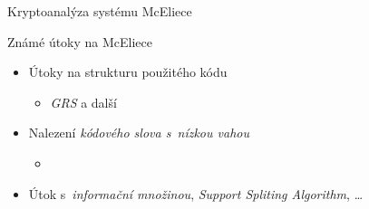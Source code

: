 \documentclass{beamer}
\begin{document}
\begin{frame}{Kryptoanalýza systému McEliece}

    \begin{alertblock}{Známé útoky na McEliece}
        \begin{itemize}

                \pause
            \item Útoky na strukturu použitého kódu
                \begin{itemize}
                    \item \emph{GRS} a další
                \end{itemize}

                \pause
            \item Nalezení \emph{kódového slova s~nízkou vahou}
                \begin{itemize}
                    \item {}~\cite{Canteaut}
                \end{itemize}

                \pause
            \item Útok s~\emph{informační množinou}, \emph{Support Spliting Algorithm}, \ldots

        \end{itemize}
    \end{alertblock}

\end{frame}
\end{document}
